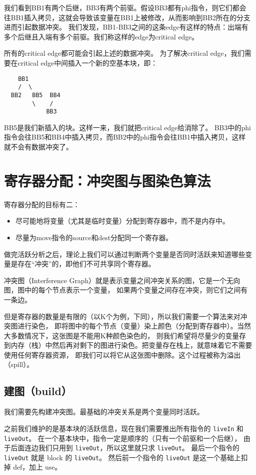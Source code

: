 我们看到BB1有两个后继，BB3有两个前驱。假设BB3都有phi指令，则它们都会往BB1插入拷贝，这就会导致该变量在BB1上被修改，从而影响到BB2所在的分支进而引起数据冲突。
我们发现，BB1-BB3之间的这条edge有这样的特点：出端有多个后继且入端有多个前驱。我们称这样的edge为critical edge。

所有的critical edge都可能会引起上述的数据冲突。
为了解决critical edge，我们需要在critical edge中间插入一个新的空基本块，即：
\begin{lstlisting}
    BB1    
    /  \       
  BB2   BB5  BB4
        \    /   
            BB3     
\end{lstlisting}

BB5是我们新插入的块。这样一来，我们就把critical edge给消除了。
BB3中的phi指令会往BB5和BB4中插入拷贝，而BB2中的phi指令会往BB1中插入拷贝，这样就不会有数据冲突了。

\section{寄存器分配：冲突图与图染色算法}
寄存器分配的目标有二：
\begin{itemize}
    \item 尽可能地将变量（尤其是临时变量）分配到寄存器中，而不是内存中。
    \item 尽量为move指令的source和dest分配同一个寄存器。
\end{itemize}

做完活跃分析之后，理论上我们可以通过判断两个变量是否同时活跃来知道哪些变量是存在“冲突”的，即他们不可共享同个寄存器。

冲突图（Interference Graph）就是表示变量之间冲突关系的图，它是一个无向图，图中的每个节点表示一个变量，
如果两个变量之间存在冲突，则它们之间有一条边。


但是寄存器的数量是有限的（以K个为例，下同），所以我们需要一个算法来对冲突图进行染色，
即将图中的每个节点（变量）染上颜色（分配到寄存器中）。当然大多数情况下，这张图是不能用K种颜色染色的，
则我们希望将尽量少的变量存到内存（栈）中然后再对剩下的图进行染色。把变量存在栈上，就意味着它不需要使用任何寄存器资源，
即我们可以将它从这张图中删除。这个过程被称为溢出（spill）。


\subsection{建图（build）}
我们需要先构建冲突图。最基础的冲突关系是两个变量同时活跃。

之前我们维护的是基本块的活跃信息，现在我们需要推出所有指令的 \texttt{liveIn} 和 \texttt{liveOut}。
在一个基本块中，指令一定是顺序的（只有一个前驱和一个后继），
由于后面连边我们只用到 \texttt{liveOut}，所以这里就只求 \texttt{liveOut}。
最后一个指令的 \texttt{liveOut} 就是 block 的 \texttt{liveOut}。
然后前一个指令的 \texttt{liveOut} 是这一个基础上扣掉 def，加上 use。

